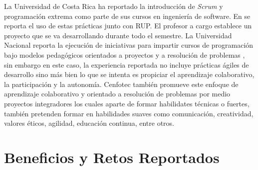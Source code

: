 \documentclass[journal]{IEEEtran}
\begin{document}
La Universidad de Costa Rica ha reportado la introducción de \emph{Scrum} y programación extrema como parte de sus cursos en ingeniería de software. En \cite{salazar} se reporta el uso de estas prácticas junto con RUP. El profesor a cargo establece un proyecto que se va desarrollando durante todo el semestre. La Universidad Nacional reporta la ejecución de iniciativas para impartir cursos de programación bajo modelos pedagógicos orientados a proyectos y a resolución de problemas \cite{mora-et-al-1, mora-et-al-2}, sin embargo en este caso, la experiencia reportada no incluye prácticas ágiles de desarrollo sino más bien lo que se intenta es propiciar el aprendizaje colaborativo, la participación y la autonomía. Cenfotec también promueve este enfoque de aprendizaje colaborativo y orientado a resolución de problemas\cite{trejos-1, cenfotec-2} por medio proyectos integradores los cuales aparte de formar habilidates técnicas o fuertes, también pretenden formar en habilidades suaves como comunicación, creatividad, valores éticos, agilidad, educación continua, entre otros.

\section{Beneficios y Retos Reportados}
\end{document}
